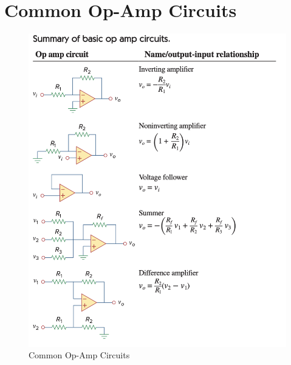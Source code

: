 
\section{Common Op-Amp Circuits} \label{app:OpAmpCircuits}
\begin{figure}[h!]
    \includegraphics[width=0.9\linewidth]{AppendixItems/OpAmps.png}
    \centering
    \caption{Common Op-Amp Circuits}
\end{figure}
